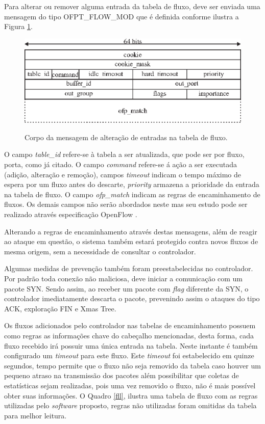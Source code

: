 Para alterar ou remover alguma entrada da tabela de fluxo, deve ser enviada uma mensagem do tipo OFPT\_FLOW\_MOD que é definida conforme ilustra a Figura \ref{fig:ofp-flow-mod}.

\begin{figure}[H]
  \centering
  \caption{Corpo da mensagem de alteração de entradas na tabela de fluxo.}
  \includegraphics[width=.80\textwidth]{images/ofp-flow-mod.eps}
  \label{fig:ofp-flow-mod}
\end{figure}
O campo \textit{table\_id} refere-se à tabela a ser atualizada, que pode ser por fluxo, porta, como já citado. O campo \textit{command} refere-se á ação a ser executada (adição, alteração e remoção), campos \textit{timeout} indicam o tempo máximo de espera por um fluxo antes do descarte, \textit{priority} armazena a prioridade da entrada na tabela de fluxo. O campo \textit{ofp\_match} indicam as regras de encaminhamento de fluxos. Os demais campos não serão abordados neste mas seu estudo pode ser realizado através especificação OpenFlow \cite{OpenFlowSpec:2014}.

Alterando a regras de encaminhamento através destas mensagens, além de reagir ao ataque em questão, o sistema também estará protegido contra novos fluxos de mesma origem, sem a necessidade de consultar o controlador.

Algumas medidas de prevenção também foram preestabelecidas no controlador. Por padrão toda conexão não maliciosa, deve iniciar a comunicação com um pacote SYN. Sendo assim, ao receber um pacote com \textit{flag} diferente da SYN, o controlador imediatamente descarta o pacote, prevenindo assim o ataques do tipo ACK, exploração FIN e Xmas Tree.

Os fluxos adicionados pelo controlador nas tabelas de encaminhamento possuem como regras as informações chave do cabeçalho mencionadas, desta forma, cada fluxo recebido irá possuir uma única entrada na tabela. Neste instante é também configurado um \textit{timeout} para este fluxo. Este \textit{timeout} foi estabelecido em quinze segundos, tempo permite que o fluxo não seja removido da tabela caso houver um pequeno atraso na transmissão dos pacotes além possibilitar que coletas de estatísticas sejam realizadas, pois uma vez removido o fluxo, não é mais possível obter suas informações. O Quadro \ref{fll}, ilustra uma tabela de fluxo com as regras utilizadas pelo \textit{software} proposto, regras não utilizadas foram omitidas da tabela para melhor leitura.

